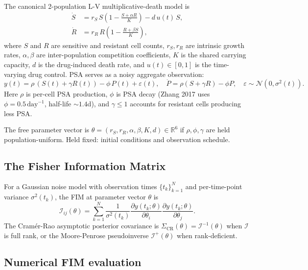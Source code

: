 \documentclass[11pt]{article}
\newcommand{\R}{\mathbb{R}}
\begin{document}
The canonical 2-population L-V multiplicative-death model is
\begin{equation}
\begin{aligned}
\dot{S} &= r_S\, S\!\left(1 - \frac{S + \alpha R}{K}\right) - d\, u(t)\, S, \\
\dot{R} &= r_R\, R\!\left(1 - \frac{R + \beta S}{K}\right),
\end{aligned}
\label{eq:2pop_dynamics}
\end{equation}
where $S$ and $R$ are sensitive and resistant cell counts, $r_S, r_R$ are
intrinsic growth rates, $\alpha, \beta$ are inter-population competition
coefficients, $K$ is the shared carrying capacity, $d$ is the drug-induced
death rate, and $u(t) \in [0, 1]$ is the time-varying drug control. PSA serves as
a noisy aggregate observation:
\begin{equation}
y(t) = \rho\,(S(t) + \gamma R(t)) - \phi\, P(t) + \varepsilon(t), \quad
\dot{P} = \rho(S + \gamma R) - \phi P, \quad \varepsilon \sim \mathcal{N}(0, \sigma^2(t)).
\label{eq:psa_obs}
\end{equation}
Here $\rho$ is per-cell PSA production, $\phi$ is PSA decay (Zhang 2017 uses
$\phi = 0.5\,\text{day}^{-1}$, half-life $\sim 1.4$d), and $\gamma \le 1$
accounts for resistant cells producing less PSA.

The free parameter vector is $\theta = (r_S, r_R, \alpha, \beta, K, d) \in \R^6$
if $\rho, \phi, \gamma$ are held population-uniform. Held fixed: initial
conditions and observation schedule.

\subsection{The Fisher Information Matrix}

For a Gaussian noise model with observation times $\{t_k\}_{k=1}^{N}$ and
per-time-point variance $\sigma^2(t_k)$, the FIM at parameter vector $\theta$ is
\begin{equation}
\mathcal{I}_{ij}(\theta) = \sum_{k=1}^{N} \frac{1}{\sigma^2(t_k)}
\frac{\partial y(t_k; \theta)}{\partial \theta_i}
\frac{\partial y(t_k; \theta)}{\partial \theta_j}.
\label{eq:fim}
\end{equation}
The Cram\'er-Rao asymptotic posterior covariance is $\Sigma_\text{CR}(\theta) =
\mathcal{I}^{-1}(\theta)$ when $\mathcal{I}$ is full rank, or the Moore-Penrose
pseudoinverse $\mathcal{I}^+(\theta)$ when rank-deficient.

\subsection{Numerical FIM evaluation}
\end{document}
